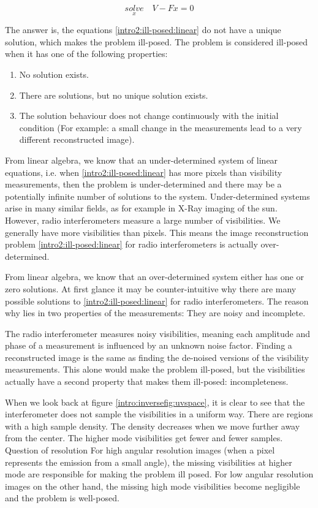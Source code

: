\begin{equation}\label{intro2:ill-posed:linear}
\underset{x}{solve}\quad V - Fx = 0
\end{equation}

The answer is, the equations \eqref{intro2:ill-posed:linear} do not have a unique solution, which makes the problem ill-posed. The problem is considered ill-posed when it has one of the following properties:
\begin{enumerate}
	\item No solution exists.
	\item There are solutions, but no unique solution exists.
	\item The solution behaviour does not change continuously with the initial condition (For example: a small change in the measurements lead to a very different reconstructed image).
\end{enumerate}
From linear algebra, we know that an under-determined system of linear equations, i.e. when \eqref{intro2:ill-posed:linear} has more pixels than visibility measurements, then the problem is under-determined and there may be a potentially infinite number of solutions to the system. Under-determined systems arise in many similar fields, as for example in X-Ray imaging of the sun\cite{felix2017compressed}. However, radio interferometers measure a large number of visibilities. We generally have more visibilities than pixels. This means the image reconstruction problem \eqref{intro2:ill-posed:linear} for radio interferometers is actually over-determined.

From linear algebra, we know that an over-determined system either has one or zero solutions. At first glance it may be counter-intuitive why there are many possible solutions to \eqref{intro2:ill-posed:linear} for radio interferometers. The reason why lies in two properties of the measurements: They are noisy and incomplete.

The radio interferometer measures noisy visibilities, meaning each amplitude and phase of a measurement is influenced by an unknown noise factor. Finding a reconstructed image is the same as finding the de-noised versions of the visibility measurements. This alone would make the problem ill-posed, but the visibilities actually have a second property that makes them ill-posed: incompleteness.

When we look back at figure \ref{intro:inversefig:uvspace}, it is clear to see that the interferometer does not sample the visibilities in a uniform way. There are regions with a high sample density. The density decreases when we move further away from the center. The higher mode visibilities get fewer and fewer samples. 
Question of resolution
For high angular resolution images (when a pixel represents the emission from a small angle), the missing visibilities at higher mode are responsible for making the problem ill posed. For low angular resolution images on the other hand, the missing high mode visibilities become negligible and the problem is well-posed. 

